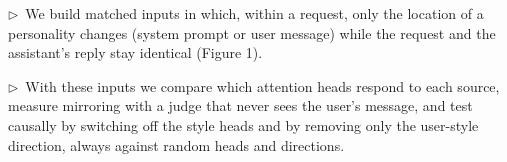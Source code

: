 \documentclass[11pt]{article}
\newcommand{\flow}[1]{\par\noindent\textcolor{blue!60!black}{\small$\triangleright$\ #1}\par\medskip}
\begin{document}
\flow{We build matched inputs in which, within a request, only the location of a personality changes (system prompt or user message) while the request and the assistant's reply stay identical (Figure 1).}

\flow{With these inputs we compare which attention heads respond to each source, measure mirroring with a judge that never sees the user's message, and test causally by switching off the style heads and by removing only the user-style direction, always against random heads and directions.}
\end{document}
